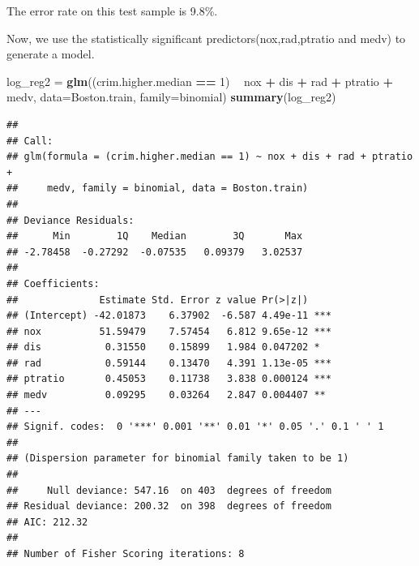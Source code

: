 \documentclass[]{article}
\newenvironment{Shaded}{\begin{snugshade}}{\end{snugshade}}
\newcommand{\KeywordTok}[1]{\textcolor[rgb]{0.13,0.29,0.53}{\textbf{#1}}}
\newcommand{\DataTypeTok}[1]{\textcolor[rgb]{0.13,0.29,0.53}{#1}}
\newcommand{\DecValTok}[1]{\textcolor[rgb]{0.00,0.00,0.81}{#1}}
\newcommand{\FloatTok}[1]{\textcolor[rgb]{0.00,0.00,0.81}{#1}}
\newcommand{\StringTok}[1]{\textcolor[rgb]{0.31,0.60,0.02}{#1}}
\newcommand{\OperatorTok}[1]{\textcolor[rgb]{0.81,0.36,0.00}{\textbf{#1}}}
\newcommand{\NormalTok}[1]{#1}
\begin{document}
The error rate on this test sample is 9.8\%.

Now, we use the statistically significant predictors(nox,rad,ptratio and
medv) to generate a model.

\begin{Shaded}
\begin{Highlighting}[]
\NormalTok{log_reg2 =}\StringTok{ }\KeywordTok{glm}\NormalTok{((crim.higher.median }\OperatorTok{==}\StringTok{ }\DecValTok{1}\NormalTok{) }\OperatorTok{~}\StringTok{ }\NormalTok{nox }\OperatorTok{+}\StringTok{ }\NormalTok{dis }\OperatorTok{+}\StringTok{ }\NormalTok{rad }\OperatorTok{+}\StringTok{ }\NormalTok{ptratio }\OperatorTok{+}\StringTok{ }\NormalTok{medv, }\DataTypeTok{data=}\NormalTok{Boston.train, }\DataTypeTok{family=}\NormalTok{binomial)}
\KeywordTok{summary}\NormalTok{(log_reg2)}
\end{Highlighting}
\end{Shaded}

\begin{verbatim}
## 
## Call:
## glm(formula = (crim.higher.median == 1) ~ nox + dis + rad + ptratio + 
##     medv, family = binomial, data = Boston.train)
## 
## Deviance Residuals: 
##      Min        1Q    Median        3Q       Max  
## -2.78458  -0.27292  -0.07535   0.09379   3.02537  
## 
## Coefficients:
##              Estimate Std. Error z value Pr(>|z|)    
## (Intercept) -42.01873    6.37902  -6.587 4.49e-11 ***
## nox          51.59479    7.57454   6.812 9.65e-12 ***
## dis           0.31550    0.15899   1.984 0.047202 *  
## rad           0.59144    0.13470   4.391 1.13e-05 ***
## ptratio       0.45053    0.11738   3.838 0.000124 ***
## medv          0.09295    0.03264   2.847 0.004407 ** 
## ---
## Signif. codes:  0 '***' 0.001 '**' 0.01 '*' 0.05 '.' 0.1 ' ' 1
## 
## (Dispersion parameter for binomial family taken to be 1)
## 
##     Null deviance: 547.16  on 403  degrees of freedom
## Residual deviance: 200.32  on 398  degrees of freedom
## AIC: 212.32
## 
## Number of Fisher Scoring iterations: 8
\end{verbatim}

\begin{Shaded}
\end{Shaded}
\end{document}
